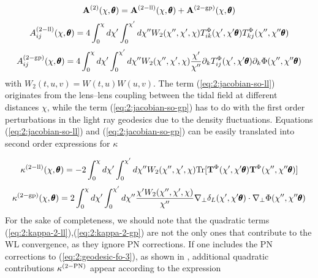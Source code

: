 \begin{equation}
\label{eq:2:jacobian-so}
\mathbf{A}^{(2)}(\chi,\pmb{\theta}) = \mathbf{A}^{(2-{\rm ll})}(\chi,\pmb{\theta}) + \mathbf{A}^{(2-{\rm gp})}(\chi,\pmb{\theta}) 
\end{equation}
%
\begin{equation}
\label{eq:2:jacobian-so-ll}
A_{ij}^{(2-{\rm ll})}(\chi,\pmb{\theta}) = 4\int_0^\chi d\chi'\int_0^{\chi'}d\chi'' W_2(\chi'',\chi',\chi)T^{\Phi}_{ik}(\chi',\chi'\pmb{\theta})T^{\Phi}_{kj}(\chi'',\chi''\pmb{\theta})
\end{equation} 
%
\begin{equation}
\label{eq:2:jacobian-so-gp}
A_{ij}^{(2-{\rm gp})}(\chi,\pmb{\theta}) = 4\int_0^\chi d\chi'\int_0^{\chi'}d\chi'' W_2(\chi'',\chi',\chi)\frac{\chi'}{\chi''}\partial_kT^{\Phi}_{ij}(\chi',\chi'\pmb{\theta})\partial_k\Phi(\chi'',\chi''\pmb{\theta})
\end{equation} 
%
with $W_2(t,u,v)=W(t,u)W(u,v)$. The term (\ref{eq:2:jacobian-so-ll}) originates from the lens--lens coupling between the tidal field at different distances $\chi$, while the term (\ref{eq:2:jacobian-so-gp}) has to do with the first order perturbations in the light ray geodesics due to the density fluctuations. Equations (\ref{eq:2:jacobian-so-ll}) and (\ref{eq:2:jacobian-so-gp}) can be easily translated into second order expressions for $\kappa$

\begin{equation}
\label{eq:2:kappa-2-ll}
\kappa^{(2-{\rm ll})}(\chi,\pmb{\theta}) = -2\int_0^\chi d\chi'\int_0^{\chi'}d\chi'' W_2(\chi'',\chi',\chi){\rm Tr} [\mathbf{T}^{\Phi}(\chi',\chi'\pmb{\theta})\mathbf{T}^{\Phi}(\chi'',\chi''\pmb{\theta})]
\end{equation} 
%
\begin{equation}
\label{eq:2:kappa-2-gp}
\kappa^{(2-{\rm gp})}(\chi,\pmb{\theta}) = 2\int_0^\chi d\chi'\int_0^{\chi'}d\chi'' \frac{\chi'W_2(\chi'',\chi',\chi)}{\chi''}\nabla_\perp \delta_L(\chi',\chi'\pmb{\theta})\cdot\nabla_\perp\Phi(\chi'',\chi''\pmb{\theta})
\end{equation} 
%
For the sake of completeness, we should note that the quadratic terms (\ref{eq:2:kappa-2-ll}),(\ref{eq:2:kappa-2-gp}) are not the only ones that contribute to the WL convergence, as they ignore PN corrections. If one includes the PN corrections to (\ref{eq:2:geodesic-fo-3}), as shown in \citep{PNLensing}, additional quadratic contributions $\kappa^{(2-{\rm PN})}$ appear according to the expression

